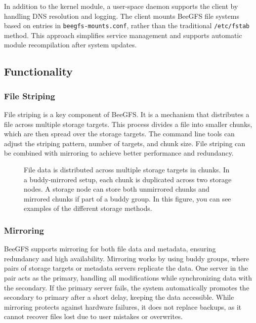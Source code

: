 In addition to the kernel module, a user-space daemon supports the client by handling DNS resolution and logging. The client mounts BeeGFS file systems based on entries in \texttt{beegfs-mounts.conf}, rather than the traditional \texttt{/etc/fstab} method. This approach simplifies service management and supports automatic module recompilation after system updates.

\subsection{Functionality}

\subsubsection{File Striping}

\vspace{-1.2em}

File striping is a key component of BeeGFS. It is a mechanism that distributes a file across multiple storage targets. This process divides a file into smaller chunks, which are then spread over the storage targets. The command line tools can adjust the striping pattern, number of targets, and chunk size. File striping can be combined with mirroring to achieve better performance and redundancy.

\begin{figure}[H]
    \centering
    
    \caption[Striping \& Mirroring in BeeGFS]{File data is distributed across multiple storage targets in chunks. In a buddy-mirrored setup, each chunk is duplicated across two storage nodes. A storage node can store both unmirrored chunks and mirrored chunks if part of a buddy group. In this figure, you can see examples of the different storage methods.}
    \label{fig:stripe}
\end{figure}

\subsubsection{Mirroring}

\vspace{-1.2em}

BeeGFS supports mirroring for both file data and metadata, ensuring redundancy and high availability. Mirroring works by using buddy groups, where pairs of storage targets or metadata servers replicate the data. One server in the pair acts as the primary, handling all modifications while synchronizing data with the secondary. If the primary server fails, the system automatically promotes the secondary to primary after a short delay, keeping the data accessible. While mirroring protects against hardware failures, it does not replace backups, as it cannot recover files lost due to user mistakes or overwrites.

